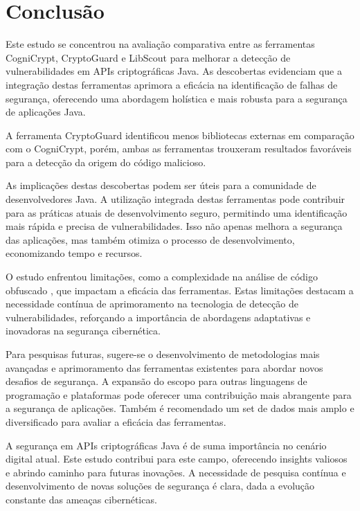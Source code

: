 \section{Conclusão}

Este estudo se concentrou na avaliação comparativa entre as ferramentas CogniCrypt, CryptoGuard e LibScout para melhorar a detecção de vulnerabilidades em APIs criptográficas Java. As descobertas evidenciam que a integração destas ferramentas aprimora a eficácia na identificação de falhas de segurança, oferecendo uma abordagem holística e mais robusta para a segurança de aplicações Java.

A ferramenta CryptoGuard identificou menos bibliotecas externas em comparação com o CogniCrypt, porém, ambas as ferramentas trouxeram resultados favoráveis para a detecção da origem do código malicioso. 

As implicações destas descobertas podem ser úteis para a comunidade de desenvolvedores Java. A utilização integrada destas ferramentas pode contribuir para as práticas atuais de desenvolvimento seguro, permitindo uma identificação mais rápida e precisa de vulnerabilidades. Isso não apenas melhora a segurança das aplicações, mas também otimiza o processo de desenvolvimento, economizando tempo e recursos.

O estudo enfrentou limitações, como a complexidade na análise de código obfuscado \cite{api_misuses_zhang}, que impactam a eficácia das ferramentas. Estas limitações destacam a necessidade contínua de aprimoramento na tecnologia de detecção de vulnerabilidades, reforçando a importância de abordagens adaptativas e inovadoras na segurança cibernética.

Para pesquisas futuras, sugere-se o desenvolvimento de metodologias mais avançadas e aprimoramento das ferramentas existentes para abordar novos desafios de segurança. A expansão do escopo para outras linguagens de programação e plataformas pode oferecer uma contribuição mais abrangente para a segurança de aplicações. Também é recomendado um set de dados mais amplo e diversificado para avaliar a eficácia das ferramentas.

A segurança em APIs criptográficas Java é de suma importância no cenário digital atual. Este estudo contribui para este campo, oferecendo insights valiosos e abrindo caminho para futuras inovações. A necessidade de pesquisa contínua e desenvolvimento de novas soluções de segurança é clara, dada a evolução constante das ameaças cibernéticas.
